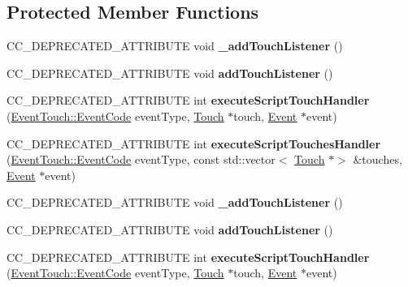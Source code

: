 \subsection*{Protected Member Functions}
\begin{DoxyCompactItemize}
\item 
\mbox{\label{classLayer_aa7bdd5dbd7796a2ea7ce2131dcfe9349}} 
C\+C\+\_\+\+D\+E\+P\+R\+E\+C\+A\+T\+E\+D\+\_\+\+A\+T\+T\+R\+I\+B\+U\+TE void {\bfseries \+\_\+add\+Touch\+Listener} ()
\item 
\mbox{\label{classLayer_a87d79546dd7547688ac0b3635a52eae0}} 
C\+C\+\_\+\+D\+E\+P\+R\+E\+C\+A\+T\+E\+D\+\_\+\+A\+T\+T\+R\+I\+B\+U\+TE void {\bfseries add\+Touch\+Listener} ()
\item 
\mbox{\label{classLayer_a2c361175f5e341d0b722a45053eb3bf7}} 
C\+C\+\_\+\+D\+E\+P\+R\+E\+C\+A\+T\+E\+D\+\_\+\+A\+T\+T\+R\+I\+B\+U\+TE int {\bfseries execute\+Script\+Touch\+Handler} (\hyperlink{classEventTouch_a35816ad7349f0b7accc0a30a469b0087}{Event\+Touch\+::\+Event\+Code} event\+Type, \hyperlink{classTouch}{Touch} $\ast$touch, \hyperlink{classEvent}{Event} $\ast$event)
\item 
\mbox{\label{classLayer_a581ac189050c88a84802871f0df7656e}} 
C\+C\+\_\+\+D\+E\+P\+R\+E\+C\+A\+T\+E\+D\+\_\+\+A\+T\+T\+R\+I\+B\+U\+TE int {\bfseries execute\+Script\+Touches\+Handler} (\hyperlink{classEventTouch_a35816ad7349f0b7accc0a30a469b0087}{Event\+Touch\+::\+Event\+Code} event\+Type, const std\+::vector$<$ \hyperlink{classTouch}{Touch} $\ast$$>$ \&touches, \hyperlink{classEvent}{Event} $\ast$event)
\item 
\mbox{\label{classLayer_aa7bdd5dbd7796a2ea7ce2131dcfe9349}} 
C\+C\+\_\+\+D\+E\+P\+R\+E\+C\+A\+T\+E\+D\+\_\+\+A\+T\+T\+R\+I\+B\+U\+TE void {\bfseries \+\_\+add\+Touch\+Listener} ()
\item 
\mbox{\label{classLayer_a87d79546dd7547688ac0b3635a52eae0}} 
C\+C\+\_\+\+D\+E\+P\+R\+E\+C\+A\+T\+E\+D\+\_\+\+A\+T\+T\+R\+I\+B\+U\+TE void {\bfseries add\+Touch\+Listener} ()
\item 
\mbox{\label{classLayer_a38871a6966dc1fa20286f1ade8740ae0}} 
C\+C\+\_\+\+D\+E\+P\+R\+E\+C\+A\+T\+E\+D\+\_\+\+A\+T\+T\+R\+I\+B\+U\+TE int {\bfseries execute\+Script\+Touch\+Handler} (\hyperlink{classEventTouch_a35816ad7349f0b7accc0a30a469b0087}{Event\+Touch\+::\+Event\+Code} event\+Type, \hyperlink{classTouch}{Touch} $\ast$touch, \hyperlink{classEvent}{Event} $\ast$event)
$$
\end{DoxyCompactItemize}
